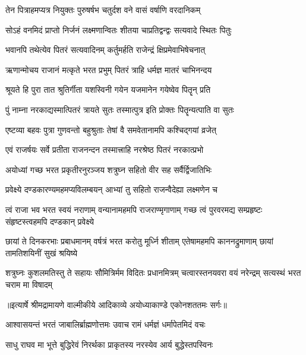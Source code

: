 \twolineshloka
{तेन पित्राहमप्यत्र नियुक्तः पुरुषर्षभ}
{चतुर्दश वने वासं वर्षाणि वरदानिकम्} %

\twolineshloka
{सोऽहं वनमिदं प्राप्तो निर्जनं लक्ष्मणान्वितः}
{शीतया चाप्रतिद्वन्द्वः सत्यवादे स्थितः पितुः} %

\twolineshloka
{भवानपि तथेत्येव पितरं सत्यवादिनम्}
{कर्तुमर्हति राजेन्द्रं क्षिप्रमेवाभिषेचनात्} %

\twolineshloka
{ऋणान्मोचय राजानं मत्कृते भरत प्रभुम्}
{पितरं त्राहि धर्मज्ञ मातरं चाभिनन्दय} %

\twolineshloka
{श्रूयते हि पुरा तात श्रुतिर्गीता यशस्विनी}
{गयेन यजमानेन गयेष्वेव पितॄन् प्रति} %

\twolineshloka
{पुं नाम्ना नरकाद्यस्मात्पितरं त्रायते सुतः}
{तस्मात्पुत्र इति प्रोक्तः पितॄन्यत्पाति वा सुतः} %

\twolineshloka
{एष्टव्या बहवः पुत्रा गुणवन्तो बहुश्रुताः}
{तेषां वै समवेतानामपि कश्चिद्गयां व्रजेत्} %

\twolineshloka
{एवं राजर्षयः सर्वे प्रतीता राजनन्दन}
{तस्मात्त्राहि नरश्रेष्ठ पितरं नरकात्प्रभो} %

\twolineshloka
{अयोध्यां गच्छ भरत प्रकृतीरनुरञ्जय}
{शत्रुघ्न सहितो वीर सह सर्वैर्द्विजातिभिः} %

\twolineshloka
{प्रवेक्ष्ये दण्डकारण्यमहमप्यविलम्बयन्}
{आभ्यां तु सहितो राजन्वैदेह्या लक्ष्मणेन च} %

\fourlineindentedshloka
{त्वं राजा भव भरत स्वयं नराणाम्}
{वन्यानामहमपि राजराण्मृगाणाम्}
{गच्छ त्वं पुरवरमद्य सम्प्रहृष्टः}
{संहृष्टस्त्वहमपि दण्डकान् प्रवेक्ष्ये} %

\fourlineindentedshloka
{छायां ते दिनकरभाः प्रबाधमानम्}
{वर्षत्रं भरत करोतु मूर्ध्नि शीताम्}
{एतेषामहमपि काननद्रुमाणाम्}
{छायां तामतिशयिनीं सुखं श्रयिष्ये} %

\fourlineindentedshloka
{शत्रुघ्नः कुशलमतिस्तु ते सहायः}
{सौमित्रिर्मम विदितः प्रधानमित्रम्}
{चत्वारस्तनयवरा वयं नरेन्द्रम्}
{सत्यस्थं भरत चराम मा विषादम्} %


{॥इत्यार्षे श्रीमद्रामायणे वाल्मीकीये आदिकाव्ये अयोध्याकाण्डे एकोनशततमः सर्गः॥}


\twolineshloka
{आश्वासयन्तं भरतं जाबालिर्ब्राह्मणोत्तमः}
{उवाच रामं धर्मज्ञं धर्मापेतमिदं वचः} %

\twolineshloka
{साधु राघव मा भूत्ते बुद्धिरेवं निरर्थका}
{प्राकृतस्य नरस्येव आर्य बुद्धेस्तपस्विनः} %


